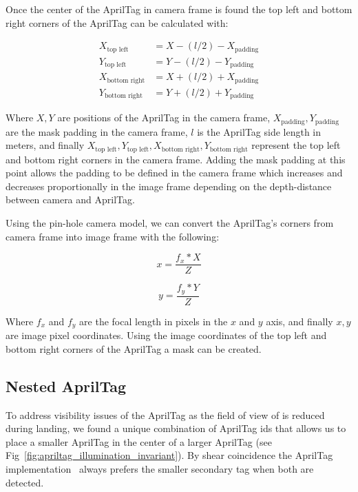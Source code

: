 \documentclass[letterpaper, 10 pt, conference]{ieeeconf}
\begin{document}
Once the center of the AprilTag in camera frame is found the top left and
bottom right corners of the AprilTag can be calculated with:

\begin{align}
  X_{\text{top left}} &= X - (l / 2) - X_{\text{padding}} \\
  Y_{\text{top left}} &= Y - (l / 2) - Y_{\text{padding}} \\
  X_{\text{bottom right}} &= X + (l / 2) + X_{\text{padding}} \\
  Y_{\text{bottom right}} &= Y + (l / 2) + Y_{\text{padding}}
\end{align}

Where $X, Y$ are positions of the AprilTag in the camera frame,
$X_{\text{padding}}, Y_{\text{padding}}$ are the mask padding in the camera
frame, $l$ is the AprilTag side length in meters, and finally $X_{\text{top
left}}, Y_{\text{top left}}, X_{\text{bottom right}}, Y_{\text{bottom right}}$
represent the top left and bottom right corners in the camera frame. Adding the
mask padding at this point allows the padding to be defined in the camera
frame which increases and decreases proportionally in the image frame
depending on the depth-distance between camera and AprilTag.

Using the pin-hole camera model, we can convert the AprilTag's corners
from camera frame into image frame with the following:

\begin{equation}
  x = \dfrac{f_{x} * X}{Z}
\end{equation}

\begin{equation}
  y = \dfrac{f_{y} * Y}{Z}
\end{equation}

Where $f_{x}$ and $f_{y}$ are the focal length in pixels in the $x$ and
$y$ axis, and finally $x, y$ are image pixel coordinates. Using the
image coordinates of the top left and bottom right corners of the AprilTag
a mask can be created.

\subsection{Nested AprilTag}
To address visibility issues of the AprilTag as the field of view of is reduced
during landing, we found a unique combination of AprilTag ids that allows us to
place a smaller AprilTag in the center of a larger AprilTag (see
Fig~\ref{fig:apriltag_illumination_invariant}). By shear coincidence the
AprilTag implementation~\cite{AprilTagMIT} always prefers the smaller secondary
tag when both are detected.
\end{document}
